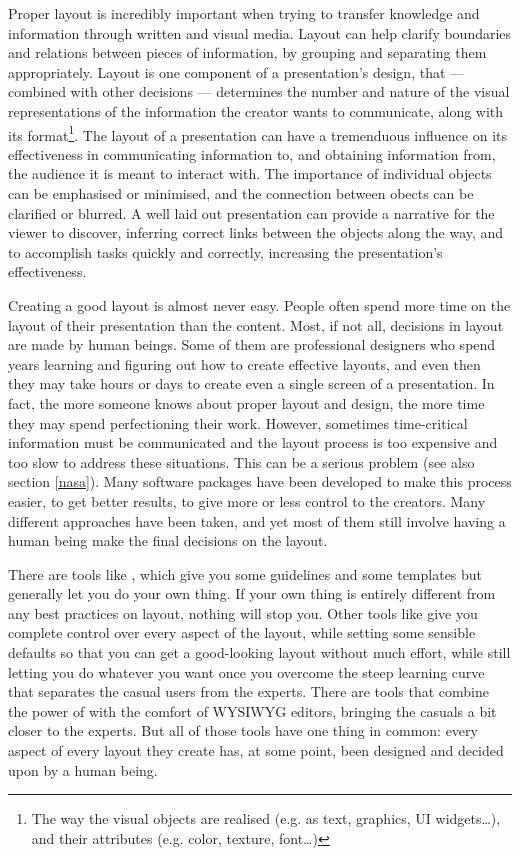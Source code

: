    Proper layout is incredibly important when trying to transfer knowledge and
   information through written and visual media. Layout can help clarify
   boundaries and relations between pieces of information, by grouping and
   separating them appropriately. Layout is one component of a presentation's
   design, that --- combined with other decisions --- determines the number and
   nature of the visual representations of the information the creator wants to
   communicate, along with its format\footnote{The way the visual objects are
   realised (e.g. as text, graphics, UI widgets\ldots), and their attributes
   (e.g. color, texture, font\ldots)}. The layout of a presentation can have a
   tremenduous influence on its effectiveness in communicating information to,
   and obtaining information from, the audience it is meant to interact with.
   The importance of individual objects can be emphasised or minimised, and the
   connection between obects can be clarified or blurred. A well laid out
   presentation can provide a narrative for the viewer to discover, inferring
   correct links between the objects along the way, and to accomplish tasks
   quickly and correctly, increasing the presentation's effectiveness.
  
   Creating a good layout is almost never easy. People often spend more time on
   the layout of their presentation than the content. Most, if not all,
   decisions in layout are made by human beings. Some of them are professional
   designers who spend years learning and figuring out how to create effective
   layouts, and even then they may take hours or days to create even a single
   screen of a presentation. In fact, the more someone knows about proper
   layout and design, the more time they may spend perfectioning their work.
   However, sometimes time-critical information must be communicated and the
   layout process is too expensive and too slow to address these situations.
   This can be a serious problem (see also section \ref{nasa}). Many software
   packages have been developed to make this process easier, to get better
   results, to give more or less control to the creators. Many different
   approaches have been taken, and yet most of them still involve having a
   human being make the final decisions on the layout.

   There are tools like \ppt, which give you some guidelines and some templates
   but generally let you do your own thing. If your own thing is entirely
   different from any best practices on layout, nothing will stop you. Other
   tools like \latex give you complete control over every aspect of the layout,
   while setting some sensible defaults so that you can get a good-looking
   layout without much effort, while still letting you do whatever you want
   once you overcome the steep learning curve that separates the casual users
   from the experts. There are tools that combine the power of \latex with the
   comfort of WYSIWYG editors, bringing the casuals a bit closer to the
   experts. But all of those tools have one thing in common: every aspect of
   every layout they create has, at some point, been designed and decided upon
   by a human being.
  

